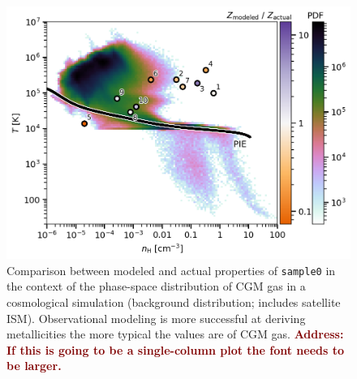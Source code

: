 \documentclass[fleqn,usenatbib]{mnras}
\newcommand{\todo}[1]{\textcolor{Maroon}{\textbf{Address: #1}}}
\begin{document}
\begin{figure}
    \centering
    \includegraphics[width=\columnwidth]{figures/sample0/phase_space.png}
    \caption{
    Comparison between modeled and actual properties of \texttt{sample0} in the context of the phase-space distribution of CGM gas in a cosmological simulation (background distribution; includes satellite ISM).
    Observational modeling is more successful at deriving metallicities the more typical the values are of CGM gas.
    \todo{If this is going to be a single-column plot the font needs to be larger.}
    }
    \label{f: idealized explanation}
\end{figure}
\end{document}
